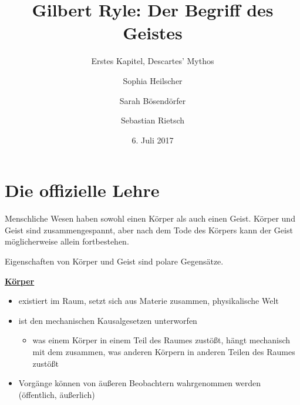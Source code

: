 \documentclass[landscape, twocolumn]{scrartcl}
\title{\vspace{-4ex}Gilbert Ryle: Der Begriff des Geistes\vspace{-0.3ex}}
\subtitle{Erstes Kapitel, Descartes' Mythos\vspace{-2ex}}
\author{Sophia Heilscher \and Sarah Bösendörfer \and Sebastian Rietsch}
\date{\vspace{-1.8ex}6. Juli 2017\vspace{-3ex}}
\begin{document}
\maketitle
\section{Die offizielle Lehre}
Menschliche Wesen haben sowohl einen Körper als auch einen Geist. Körper und Geist sind zusammengespannt, aber nach dem Tode des Körpers kann der Geist möglicherweise allein fortbestehen.

\noindent Eigenschaften von Körper und Geist sind polare Gegensätze.

\begin{center} \underline{\textbf{Körper}} \end{center}
\begin{itemize}
    \item
        existiert im Raum, setzt sich aus Materie zusammen, physikalische Welt
    \item
        ist den mechanischen Kausalgesetzen unterworfen
        \begin{itemize}
            \item
                was einem Körper in einem Teil des Raumes zustößt, hängt mechanisch mit dem zusammen, was anderen Körpern in anderen Teilen des Raumes zustößt
        \end{itemize}
    \item
        Vorgänge können von äußeren Beobachtern wahrgenommen werden (öffentlich, äußerlich)
\end{itemize}
\end{document}
